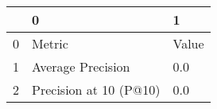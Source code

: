 \begin{tabular}{lll}
\toprule
{} &                       0 &      1 \\
\midrule
0 &                  Metric &  Value \\
1 &       Average Precision &    0.0 \\
2 &  Precision at 10 (P@10) &    0.0 \\
\bottomrule
\end{tabular}
